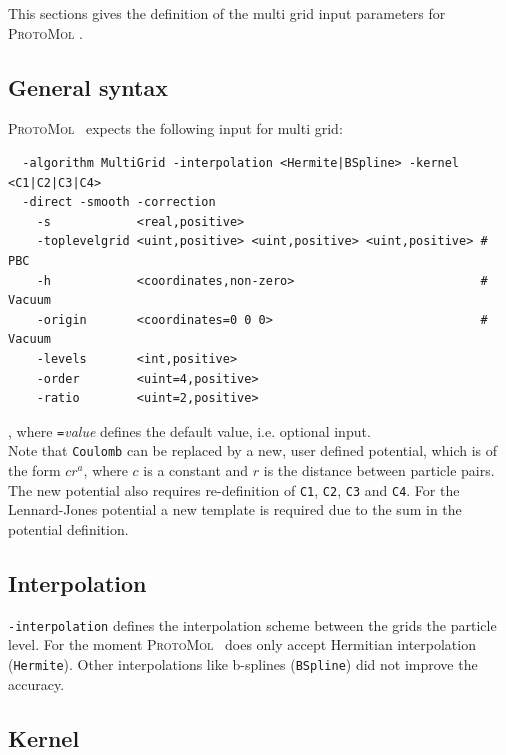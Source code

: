 \documentclass[11pt]{article}
\newcommand{\ProtoMol}{\textsc{ProtoMol }}
\begin{document}
This sections gives the definition of the multi grid input parameters
for \ProtoMol. 

\subsection{General syntax}

\ProtoMol\  expects the following input for multi grid:
\small
\begin{verbatim}
  -algorithm MultiGrid -interpolation <Hermite|BSpline> -kernel <C1|C2|C3|C4>
  -direct -smooth -correction
    -s            <real,positive>       
    -toplevelgrid <uint,positive> <uint,positive> <uint,positive> # PBC
    -h            <coordinates,non-zero>                          # Vacuum
    -origin       <coordinates=0 0 0>                             # Vacuum
    -levels       <int,positive>
    -order        <uint=4,positive>     
    -ratio        <uint=2,positive>
 \end{verbatim}
\normalsize
, where \texttt{=}{\it value} defines the default value, i.e. optional
input.\\
Note that \texttt{Coulomb} can be replaced by a new, user defined potential,
which is of the form $c r^a$, where $c$ is a constant and $r$ is the
distance between particle pairs. The new potential also requires
re-definition of \texttt{C1}, \texttt{C2},  \texttt{C3} and
\texttt{C4}. For the Lennard-Jones potential a new template is
required due to the sum in the potential definition.

\subsection{Interpolation}

\texttt{-interpolation} defines the interpolation scheme between the
grids the particle level. For the moment \ProtoMol\
does only accept Hermitian interpolation (\texttt{Hermite}). Other
interpolations like b-splines (\texttt{BSpline}) did not improve the
accuracy.

\subsection{Kernel}
\end{document}
